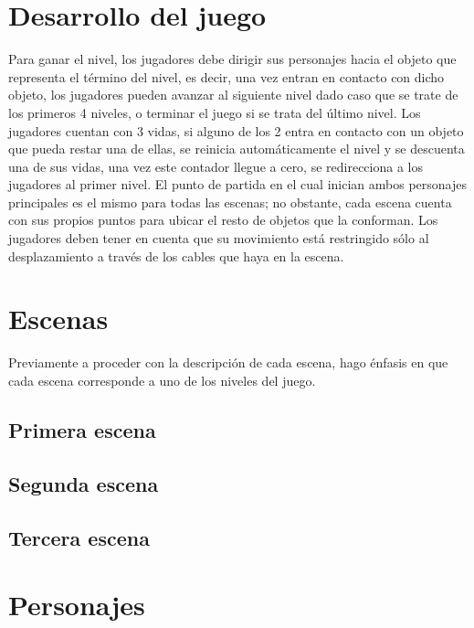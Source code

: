 \documentclass{article}
\begin{document}
\section{Desarrollo del juego}
Para ganar el nivel, los jugadores debe dirigir sus personajes hacia el objeto que representa el término del nivel, es decir, una vez entran en contacto con dicho objeto, los jugadores pueden avanzar al siguiente nivel dado caso que se trate de los primeros 4 niveles, o terminar el juego si se trata del último nivel. Los jugadores cuentan con 3 vidas, si alguno de los 2 entra en contacto con un objeto que pueda restar una de ellas, se reinicia automáticamente el nivel y se descuenta una de sus vidas, una vez este contador llegue a cero, se redirecciona a los jugadores al primer nivel. El punto de partida en el cual inician ambos personajes principales es el mismo para todas las escenas; no obstante, cada escena cuenta con sus propios puntos para ubicar el resto de objetos que la conforman. Los jugadores deben tener en cuenta que su movimiento está restringido sólo al desplazamiento a través de los cables que haya en la escena.
\section{Escenas}
Previamente a proceder con la descripción de cada escena, hago énfasis en que cada escena corresponde a uno de los niveles del juego.
\subsection{Primera escena}

\subsection{Segunda escena}

\subsection{Tercera escena}

\section{Personajes}
\end{document}
